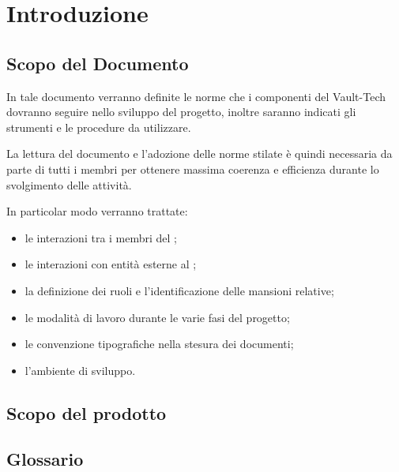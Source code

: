 \documentclass[a4paper, titlepage]{article}
\begin{document}
\pagestyle{fancy}	

\maketitle



\newpage
\tableofcontents

\newpage
\listoffigures \label{lastromanpage}

\newpage
\clearpage
{}
\hypersetup{linkcolor=blue}

\section{Introduzione}
\subsection{Scopo del Documento}
In tale documento verranno definite le norme che i componenti del  Vault-Tech dovranno seguire nello sviluppo del progetto, inoltre saranno indicati gli strumenti e le procedure da utilizzare.

La lettura del documento e l'adozione delle norme stilate è quindi necessaria da parte di tutti i membri per ottenere massima coerenza e efficienza durante lo svolgimento delle attività.

In particolar modo verranno trattate:
\begin{itemize}
	\item le interazioni tra i membri del ;
	\item le interazioni con entità esterne al ;
	\item la definizione dei ruoli e l'identificazione delle mansioni relative;
	\item le modalità di lavoro durante le varie fasi del progetto;
	\item le convenzione tipografiche nella stesura dei documenti;
	\item l'ambiente di sviluppo.
\end{itemize}

\subsection{Scopo del prodotto}
\SCOPO

\subsection{Glossario}
\GLOSSARIO
\end{document}
